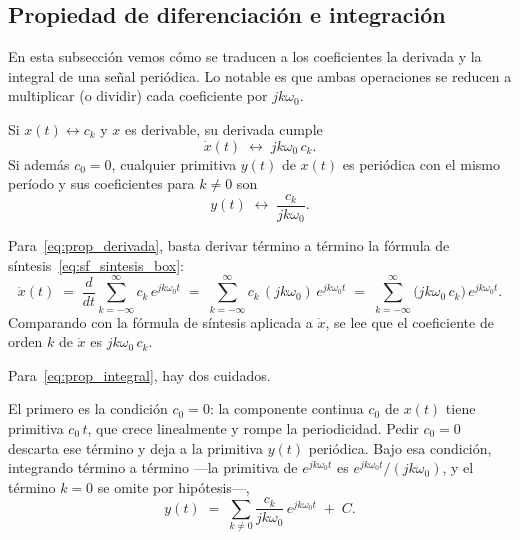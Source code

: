 \documentclass[class=book, crop=false]{standalone}
\begin{document}
\subsection{Propiedad de diferenciación e integración}
\label{subsec:prop_derivada_integral}

En esta subsección vemos cómo se traducen a los coeficientes la
derivada y la integral de una señal periódica. Lo notable es que
ambas operaciones se reducen a multiplicar (o dividir) cada
coeficiente por $jk\omega_0$.

\begin{resultado}
Si $x(t)\leftrightarrow c_k$ y $x$ es derivable, su derivada cumple
\begin{equation}
    \dot{x}(t) \;\longleftrightarrow\; jk\omega_0\,c_k.
    \label{eq:prop_derivada}
\end{equation}
Si además $c_0 = 0$, cualquier primitiva $y(t)$ de $x(t)$ es
periódica con el mismo período y sus coeficientes para $k\neq 0$ son
\begin{equation}
    y(t) \;\longleftrightarrow\; \frac{c_k}{jk\omega_0}.
    \label{eq:prop_integral}
\end{equation}
\end{resultado}

Para~\eqref{eq:prop_derivada}, basta derivar término a término la
fórmula de síntesis~\eqref{eq:sf_sintesis_box}:
\begin{equation*}
    \dot{x}(t)
    \;=\; \frac{d}{dt}\sum_{k=-\infty}^{\infty} c_k\,e^{jk\omega_0 t}
    \;=\; \sum_{k=-\infty}^{\infty} c_k\,(jk\omega_0)\,e^{jk\omega_0 t}
    \;=\; \sum_{k=-\infty}^{\infty}\bigl(jk\omega_0\,c_k\bigr)\,e^{jk\omega_0 t}.
\end{equation*}
Comparando con la fórmula de síntesis aplicada a $\dot{x}$, se lee
que el coeficiente de orden $k$ de $\dot{x}$ es $jk\omega_0\,c_k$.

Para~\eqref{eq:prop_integral}, hay dos cuidados.

El primero es la condición $c_0 = 0$: la componente continua $c_0$
de $x(t)$ tiene primitiva $c_0\,t$, que crece linealmente y rompe
la periodicidad. Pedir $c_0 = 0$ descarta ese término y deja a la
primitiva $y(t)$ periódica. Bajo esa condición, integrando término
a término ---la primitiva de $e^{jk\omega_0 t}$ es
$e^{jk\omega_0 t}/(jk\omega_0)$, y el término $k=0$ se omite por
hipótesis---,
\begin{equation*}
    y(t)
    \;=\; \sum_{k\neq 0}\frac{c_k}{jk\omega_0}\,e^{jk\omega_0 t}
        \;+\; C.
\end{equation*}
\end{document}

